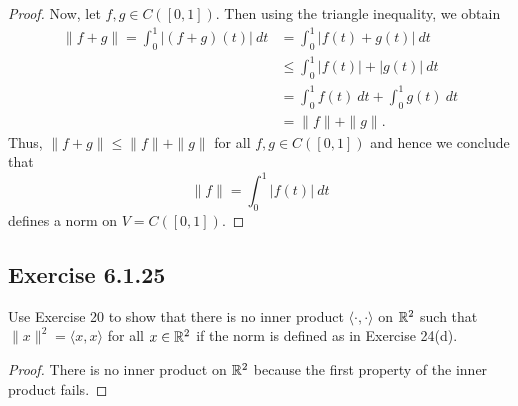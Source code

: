 \begin{enumerate}
\begin{proof}
        Now, let \( f,g \in C([0,1]) \). Then using the triangle inequality, we obtain
        \begin{align*}
            \| f + g \| = \int_{ 0 }^{ 1 } | (f+g)(t) |  \ dt &= \int_{ 0 }^{ 1 }  | f(t) + g(t) |  \ dt \\
                                                              &\leq \int_{ 0 }^{ 1 } | f(t) |  + | g(t) |  \ dt \\
                                                              &= \int_{ 0 }^{ 1 } f(t)  \ dt + \int_{ 0 }^{ 1 }  g(t) \ dt \\
                                                              &= \|f\| + \|g\|.
        \end{align*}
        Thus, \( \|f+g\| \leq \|f\| + \|g\| \) for all \( f,g \in C([0,1]) \) and hence we conclude that
        \[ \|f\| = \int_{ 0 }^{ 1 } | f(t) |  \ dt  \]
        defines a norm on \( V = C([0,1])  \).
        \end{proof}
\end{enumerate}

\subsection*{Exercise 6.1.25} Use Exercise 20 to show that there is no inner product \( \langle \cdot , \cdot \rangle \) on \( \mathbb{R}^{2} \) such that \( \|x\|^{2} = \langle x , x \rangle \) for all \( x \in \mathbb{R}^{2} \) if the norm is defined as in Exercise 24(d).
\begin{proof}
There is no inner product on \( \mathbb{R}^{2} \) because the first property of the inner product fails.
\end{proof}

